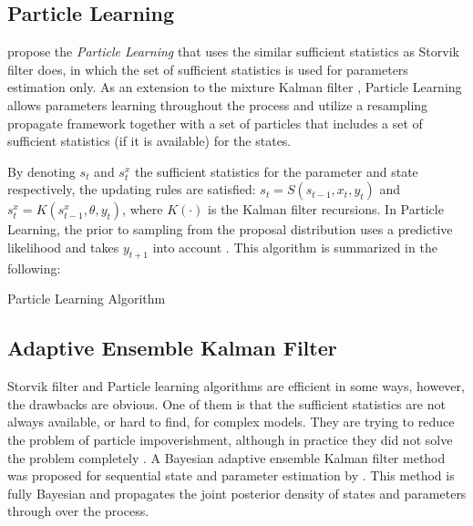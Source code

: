 \subsection{Particle Learning}

\cite{carvalho2010particle} propose the  \textit{Particle Learning} that uses the similar sufficient statistics as Storvik filter does, in which the set of sufficient statistics is used for parameters estimation only. As an extension to the mixture Kalman filter \citep{chen2000mixture}, Particle Learning allows parameters learning throughout the process and utilize a resampling propagate framework together with a set of particles that includes a set of sufficient statistics (if it is available) for the states. 

By denoting $s_t$ and $s_t^x$ the sufficient statistics for the parameter and state respectively, the updating rules are satisfied: $s_t=S(s_{t-1},x_t,y_t)$ and $s_t^x=K\left(s_{t-1}^x,\theta,y_t\right)$, where $K(\cdot)$ is the Kalman filter recursions. In Particle Learning, the prior to sampling from the proposal distribution uses a predictive likelihood and takes $y_{t+1}$ into account \citep{vieira2016online}. This algorithm is summarized in the following: 
\begin{algorithm}[h]
\SetAlgoLined 
\caption{Particle Learning Algorithm}\label{algorithmPL}
\end{algorithm}

\subsection{Adaptive Ensemble Kalman Filter}

Storvik filter and Particle learning algorithms are efficient in some ways,  however, the drawbacks are obvious. One of them is that the sufficient statistics are not always available, or hard to find, for complex models. They are trying to reduce the problem of particle impoverishment, although in practice they did not solve the problem completely \citep{chopin2010particle}. A Bayesian adaptive ensemble Kalman filter method was proposed for sequential state and parameter estimation by \cite{stroud2018bayesian}. This method is fully Bayesian and propagates the joint posterior density of states and parameters through over the process. 


